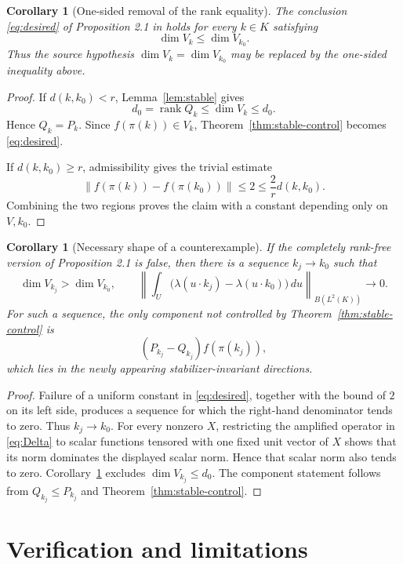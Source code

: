 \documentclass[11pt]{article}
\newtheorem{corollary}[theorem]{Corollary}
\begin{document}
\begin{corollary}[One-sided removal of the rank equality]\label{cor:onesided}
The conclusion \eqref{eq:desired} of Proposition 2.1 in \cite{source} holds for every $k\in K$ satisfying
\[
 \dim V_k\leq\dim V_{k_0}.
\]
Thus the source hypothesis $\dim V_k=\dim V_{k_0}$ may be replaced by the one-sided inequality above.
\end{corollary}

\begin{proof}
If $d(k,k_0)<r$, Lemma~\ref{lem:stable} gives
\[
 d_0=\operatorname{rank}Q_k\leq\dim V_k\leq d_0.
\]
Hence $Q_k=P_k$.  Since $f(\pi(k))\in V_k$, Theorem~\ref{thm:stable-control} becomes \eqref{eq:desired}.

If $d(k,k_0)\geq r$, admissibility gives the trivial estimate
\[
 \|f(\pi(k))-f(\pi(k_0))\|\leq2
 \leq \frac{2}{r}d(k,k_0).
\]
Combining the two regions proves the claim with a constant depending only on $V,k_0$.
\end{proof}

\begin{corollary}[Necessary shape of a counterexample]\label{cor:obstruction}
If the completely rank-free version of Proposition 2.1 is false, then there is a sequence $k_j\to k_0$ such that
\[
 \dim V_{k_j}>\dim V_{k_0},
 \qquad
 \left\|\int_U\bigl(\lambda(u\cdot k_j)-\lambda(u\cdot k_0)\bigr)\,du\right\|_{B(L^2(K))}\to0.
\]
For such a sequence, the only component not controlled by Theorem~\ref{thm:stable-control} is
\[
 (P_{k_j}-Q_{k_j})f(\pi(k_j)),
\]
which lies in the newly appearing stabilizer-invariant directions.
\end{corollary}

\begin{proof}
Failure of a uniform constant in \eqref{eq:desired}, together with the bound of $2$ on its left side, produces a sequence for which the right-hand denominator tends to zero.  Thus $k_j\to k_0$.  For every nonzero $X$, restricting the amplified operator in \eqref{eq:Delta} to scalar functions tensored with one fixed unit vector of $X$ shows that its norm dominates the displayed scalar norm.  Hence that scalar norm also tends to zero.  Corollary~\ref{cor:onesided} excludes $\dim V_{k_j}\leq d_0$.  The component statement follows from $Q_{k_j}\leq P_{k_j}$ and Theorem~\ref{thm:stable-control}.
\end{proof}

\section{Verification and limitations}
\end{document}

